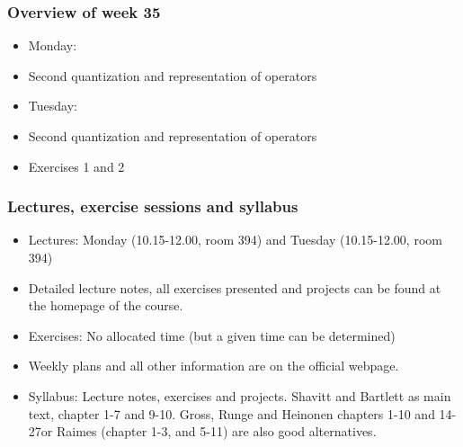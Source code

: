 \documentclass{beamer}
\begin{document}
\begin{frame}
\frametitle{Overview of week 35}

\begin{block}{}
\begin{itemize}
\item Monday:

\item Second quantization and representation of operators

\item Tuesday:

\item Second quantization and representation of operators

\item Exercises 1 and 2
\end{itemize}

\noindent
\end{block}
\end{frame}

\begin{frame}
\frametitle{Lectures, exercise sessions and syllabus}

\begin{block}{}
\begin{itemize}
\item Lectures: Monday (10.15-12.00, room 394) and Tuesday (10.15-12.00, room 394)

\item Detailed lecture notes, all exercises presented and projects can be found at the homepage of the course.

\item Exercises: No allocated time (but a given time can be determined)

\item Weekly plans and all other information are on the official webpage.

\item Syllabus: Lecture notes, exercises and projects. Shavitt and Bartlett as main text, chapter 1-7 and 9-10. Gross, Runge and Heinonen chapters 1-10 and 14-27or  Raimes (chapter 1-3, and 5-11) are also good alternatives.
\end{itemize}

\noindent
\end{block}
\end{frame}
\end{document}
